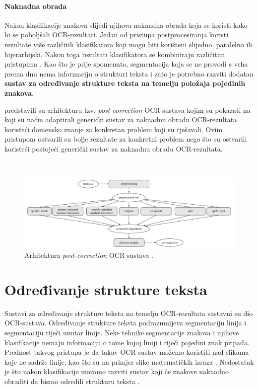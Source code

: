 \documentclass[times, utf8, zavrsni]{fer}
\begin{document}
\subsubsection{Naknadna obrada}
Nakon klasifikacije znakova slijedi njihova naknadna obrada koja se koristi kako
bi se poboljšali OCR-rezultati. Jedan od pristupa postprocesiranja koristi
rezultate više različitih klasifikatora koji mogu biti korišteni slijedno,
paralelno ili hijerarhijski. Nakon toga rezultati klasifikatora se kombiniraju
različitim pristupima \citep{DBLP:journals/corr/abs-1710-05703}. Kao što je
prije spomenuto, segmentacija koja se ne provodi s vrha
prema dnu nema informaciju o strukturi teksta i zato je potrebno razviti dodatan
\textbf{sustav za određivanje strukture teksta na temelju položaja pojedinih
znakova}.

\citep{schulz2017multi} predstavili su arhitekturu
tzv. \emph{post-correction} OCR-sustava kojim su pokazati na koji su način
adaptirali generički sustav za naknadnu obradu OCR-rezultata koristeći domensko
znanje za konkretan problem koji su rješavali. Ovim pristupom ostvarili su bolje
rezultate za konkretni problem nego što su ostvarili koristeći postojeći
generički sustav za naknadnu obradu OCR-rezultata.

\

\begin{figure}[htb]
    \centering
    \includegraphics[width=\textwidth]{images/post-correction-example-01.png}
    \caption{
        Arhitektura \emph{post-correction} OCR sustava \citep{schulz2017multi}.
    }
    \label{fig:post-correction-example-01}
\end{figure}
















\chapter{Određivanje strukture teksta}
Sustavi za određivanje strukture teksta na temelju OCR-rezultata sastavni su
dio OCR-sustava. Određivanje strukture teksta podrazumijeva segmentaciju linija
i segmentaciju riječi unutar linije. Neke tehnike segmentacije znakova i
njihove klasifikacije nemaju informaciju o tome kojoj liniji i riječi pojedini
znak pripada. Prednost takvog pristupa je da takav OCR-sustav možemo koristiti
nad slikama koje ne sadrže linije, kao što su na primjer slike matematičkih
izraza \citep{Jurin:2017:Master}. Nedostatak je što nakon klasifikacije moramo
razviti sustav koji će znakove naknadno obraditi da bismo odredili strukturu
teksta \citep{Jurin:2017:Master}.
\end{document}
